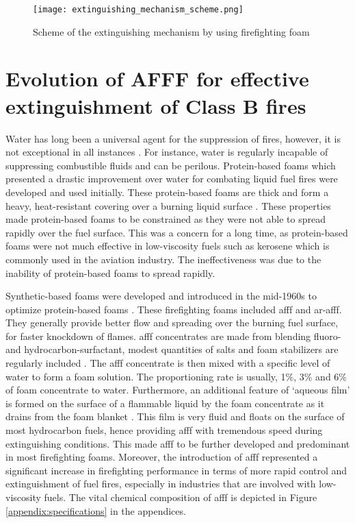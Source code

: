 \begin{figure}[H]
    \centering
    \texttt{[image: extinguishing\_mechanism\_scheme.png]}
    \caption{Scheme of the extinguishing mechanism by using firefighting foam \cite{turekova2011environmental}}
    \label{ch2:figure:scheme}
\end{figure}

\section{Evolution of AFFF for effective extinguishment of Class B fires}
Water has long been a universal agent for the suppression of fires, however, it is not exceptional in all instances \cite{hinnant2020characterizing}. For instance, water is regularly incapable of suppressing combustible fluids and can be perilous. Protein-based foams which presented a drastic improvement over water for combating liquid fuel fires were developed and used initially. These protein-based foams are thick and form a heavy, heat-resistant covering over a burning liquid surface \cite{scheffey1995evaluating}. These properties made protein-based foams to be constrained as they were not able to spread rapidly over the fuel surface. This was a concern for a long time, as protein-based foams were not much effective in low-viscosity fuels such as kerosene which is commonly used in the aviation industry. The ineffectiveness was due to the inability of protein-based foams to spread rapidly. 

Synthetic-based foams were developed and introduced in the mid-1960s to optimize protein-based foams \cite{aamodt2020review}. These firefighting foams included \acrshort{afff} and \acrshort{ar-afff}. They generally provide better flow and spreading over the burning fuel surface, for faster knockdown of flames. \acrshort{afff} concentrates are made from blending fluoro-and hydrocarbon-surfactant, modest quantities of salts and foam stabilizers are regularly included \cite{wang2019research}. The \acrshort{afff} concentrate is then mixed with a specific level of water to form a foam solution. The proportioning rate is usually, 1\%, 3\% and 6\% of foam concentrate to water. Furthermore, an additional feature of ‘aqueous film’ is formed on the surface of a flammable liquid by the foam concentrate as it drains from the foam blanket \cite{hinnant2020characterizing}. This film is very fluid and floats on the surface of most hydrocarbon fuels, hence providing \acrshort{afff} with tremendous speed during extinguishing conditions. This made \acrshort{afff} to be further developed and predominant in most firefighting foams. Moreover, the introduction of \acrshort{afff} represented a significant increase in firefighting performance in terms of more rapid control and extinguishment of fuel fires, especially in industries that are involved with low-viscosity fuels. The vital chemical composition of \acrshort{afff} is depicted in Figure \ref{appendix:specifications} in the appendices. 

